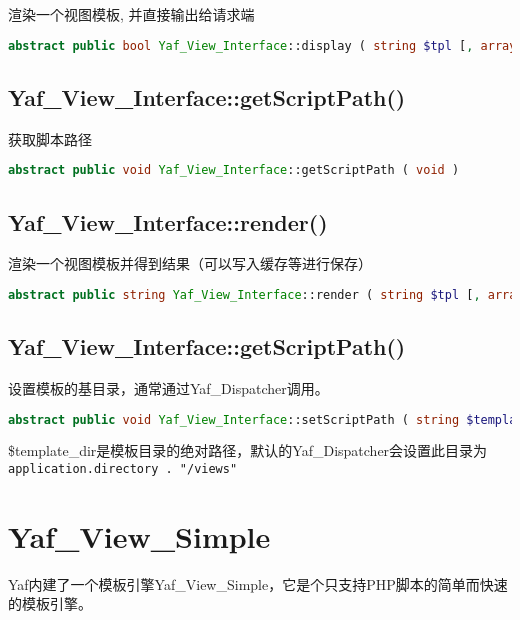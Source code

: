 渲染一个视图模板, 并直接输出给请求端


\begin{lstlisting}[language=PHP]
abstract public bool Yaf_View_Interface::display ( string $tpl [, array $tpl_vars ] )
\end{lstlisting}





\section{Yaf\_View\_Interface::getScriptPath()}

获取脚本路径

\begin{lstlisting}[language=PHP]
abstract public void Yaf_View_Interface::getScriptPath ( void )
\end{lstlisting}

\section{Yaf\_View\_Interface::render()}

渲染一个视图模板并得到结果（可以写入缓存等进行保存）

\begin{lstlisting}[language=PHP]
abstract public string Yaf_View_Interface::render ( string $tpl [, array $tpl_vars ] )
\end{lstlisting}


\section{Yaf\_View\_Interface::getScriptPath()}

设置模板的基目录，通常通过Yaf\_Dispatcher调用。



\begin{lstlisting}[language=PHP]
abstract public void Yaf_View_Interface::setScriptPath ( string $template_dir )
\end{lstlisting}


\$template\_dir是模板目录的绝对路径，默认的Yaf\_Dispatcher会设置此目录为\texttt{application.directory . "/views"}

\chapter{Yaf\_View\_Simple}


Yaf内建了一个模板引擎Yaf\_View\_Simple，它是个只支持PHP脚本的简单而快速的模板引擎。




